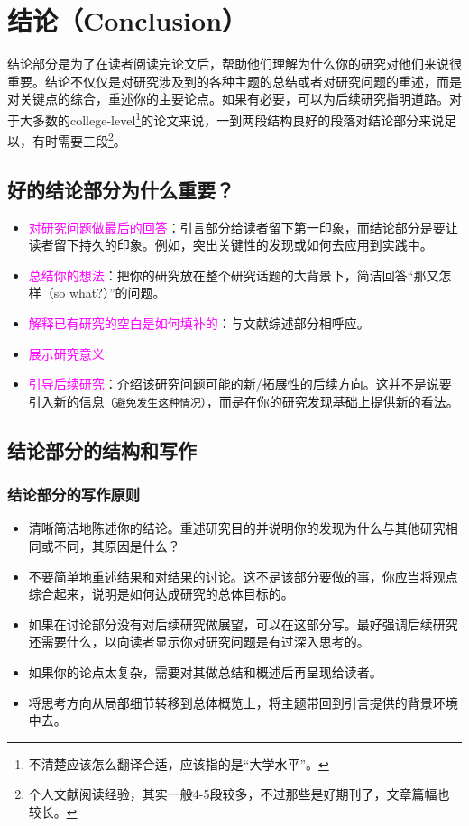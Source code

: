 \documentclass[cn,hazy,blue,14pt,screen]{elegantnote} %
\begin{document}
\newpage

\section{结论（Conclusion）}

结论部分是为了在读者阅读完论文后，帮助他们理解为什么你的研究对他们来说很重要。结论不仅仅是对研究涉及到的各种主题的总结或者对研究问题的重述，而是对关键点的综合，重述你的主要论点。如果有必要，可以为后续研究指明道路。对于大多数的college-level\footnote{不清楚应该怎么翻译合适，应该指的是“大学水平”。}的论文来说，一到两段结构良好的段落对结论部分来说足以，有时需要三段\footnote{个人文献阅读经验，其实一般4-5段较多，不过那些是好期刊了，文章篇幅也较长。}。

\subsection{好的结论部分为什么重要？}

\begin{itemize}
  \item \textcolor{magenta}{对研究问题做最后的回答}：引言部分给读者留下第一印象，而结论部分是要让读者留下持久的印象。例如，突出关键性的发现或如何去应用到实践中。
  \item \textcolor{magenta}{总结你的想法}：把你的研究放在整个研究话题的大背景下，简洁回答“那又怎样（so what?）”的问题。
  \item \textcolor{magenta}{解释已有研究的空白是如何填补的}：与文献综述部分相呼应。
  \item \textcolor{magenta}{展示研究意义}
  \item \textcolor{magenta}{引导后续研究}：介绍该研究问题可能的新/拓展性的后续方向。这并不是说要引入新的信息\lstinline{（避免发生这种情况）}，而是在你的研究发现基础上提供新的看法。
\end{itemize}

\subsection{结论部分的结构和写作}

\subsubsection{结论部分的写作原则}

\begin{itemize}
  \item 清晰简洁地陈述你的结论。重述研究目的并说明你的发现为什么与其他研究相同或不同，其原因是什么？
  \item 不要简单地重述结果和对结果的讨论。这不是该部分要做的事，你应当将观点综合起来，说明是如何达成研究的总体目标的。
  \item 如果在讨论部分没有对后续研究做展望，可以在这部分写。最好强调后续研究还需要什么，以向读者显示你对研究问题是有过深入思考的。
  \item 如果你的论点太复杂，需要对其做总结和概述后再呈现给读者。
  \item 将思考方向从局部细节转移到总体概览上，将主题带回到引言提供的背景环境中去。
\end{itemize}
\end{document}
